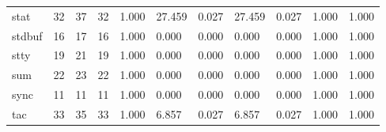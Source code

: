 \begin{longtable}{lp{1.2cm}p{1.2cm}p{1.2cm}p{1.2cm}p{1.2cm}p{1.2cm}p{1.2cm}p{1.2cm}p{1.2cm}p{1.2cm}}
stat      &                           32 &                 37 &                                32 &                                      1.000 &                                 27.459 &                                        0.027 &                            27.459 &                                   0.027 &                              1.000 &                                              1.000 \\
stdbuf    &                           16 &                 17 &                                16 &                                      1.000 &                                  0.000 &                                        0.000 &                             0.000 &                                   0.000 &                              1.000 &                                              1.000 \\
stty      &                           19 &                 21 &                                19 &                                      1.000 &                                  0.000 &                                        0.000 &                             0.000 &                                   0.000 &                              1.000 &                                              1.000 \\
sum       &                           22 &                 23 &                                22 &                                      1.000 &                                  0.000 &                                        0.000 &                             0.000 &                                   0.000 &                              1.000 &                                              1.000 \\
sync      &                           11 &                 11 &                                11 &                                      1.000 &                                  0.000 &                                        0.000 &                             0.000 &                                   0.000 &                              1.000 &                                              1.000 \\
tac       &                           33 &                 35 &                                33 &                                      1.000 &                                  6.857 &                                        0.027 &                             6.857 &                                   0.027 &                              1.000 &                                              1.000 \\

\end{longtable}
